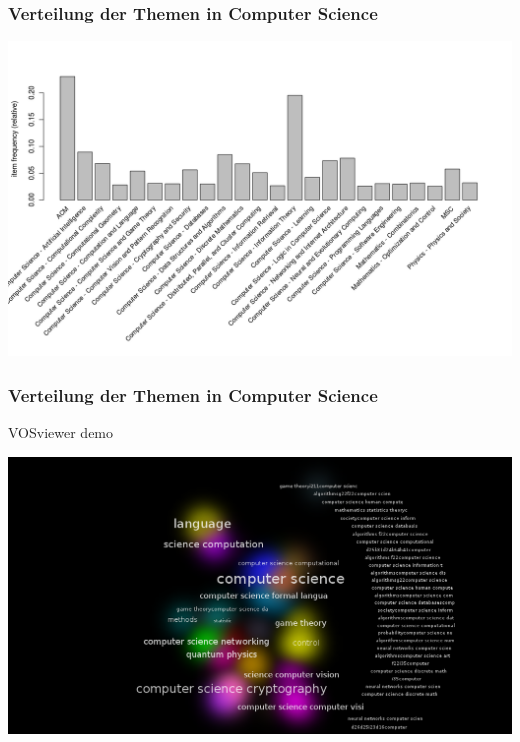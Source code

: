 \documentclass[12pt, xcolor=table]{beamer}
\begin{document}
\begin{frame}
	\frametitle{Verteilung der Themen in Computer Science}
	\begin{center}
		\includegraphics[scale=0.4]{../../visual/csFrequent_filter_acm_and_msc.png}
	\end{center}
\end{frame}
\begin{frame}
	\frametitle{Verteilung der Themen in Computer Science}
    VOSviewer demo
	\begin{center}
		\includegraphics[scale=0.25]{../../visual/cs_subs_cluster_density.png}
	\end{center}
\end{frame}
\end{document}
